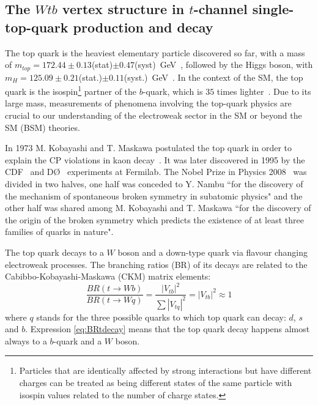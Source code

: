 \subsection{The \boldmath$Wtb$ vertex structure in \boldmath$t$-channel single-top-quark production and decay} \label{subsec:Wtb}

The top quark is the heaviest elementary particle discovered so far, with a mass of $m_{top}=172.44 \pm 0.13$(stat)$\pm 0.47$(syst)~GeV~\cite{Khachatryan:2015hba}, followed by the Higgs boson, with $m_{H}=125.09\pm0.21$(stat.)$\pm0.11$(syst.)~GeV~\cite{Aad:2015zhl}. In the context of the SM, the top quark is the isospin\footnote{Particles that are identically affected by strong interactions but have different charges can be treated as being different states of the same particle with isospin values related to the number of charge states.} partner of the $b$-quark, which is $35$ times lighter~\cite{Olive:2016xmw}. Due to its large mass, measurements of phenomena involving the top-quark physics are crucial to our understanding of the electroweak sector in the SM or beyond the SM (BSM) theories. 

In 1973 M. Kobayashi and T. Maskawa postulated the top quark in order to explain the CP violations in kaon decay~\cite{Kobayashi:1973fv}. It was later discovered in 1995 by the CDF~\cite{PhysRevLett.74.2626} and DØ~\cite{Abachi:1995iq} experiments at Fermilab. The Nobel Prize in Physics 2008~\cite{NobelPrize} was divided in two halves, one half was conceded to Y. Nambu ``for the discovery of the mechanism of spontaneous broken symmetry in subatomic physics" and the other half was shared among M. Kobayashi and T. Maskawa ``for the discovery of the origin of the broken symmetry which predicts the existence of at least three families of quarks in nature".

The top quark decays to a $W$ boson and a down-type quark via flavour changing electroweak processes. The branching ratios (BR) of its decays are related to the Cabibbo-Kobayashi-Maskawa (CKM) matrix elements:
\begin{equation} \label{eq:BRtdecay}
\frac{BR(t \rightarrow Wb)}{BR(t \rightarrow Wq)}= \frac{|V_{tb}|^2}{\sum |V_{tq}|^2} =  |V_{tb}|^2 \approx 1
\end{equation}
where $q$ stands for the three possible quarks to which top quark can decay: $d$, $s$ and $b$. Expression \ref{eq:BRtdecay} means that the top quark decay happens almost always to a $b$-quark and a $W$ boson.

